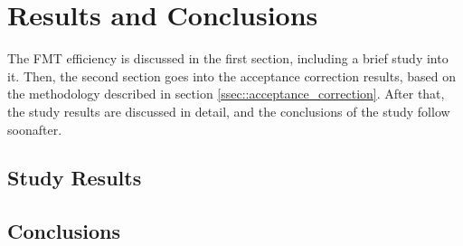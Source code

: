 \section{Results and Conclusions} \label{sec::resultsandconclusions}
    The FMT efficiency is discussed in the first section, including a brief study into it.
    Then, the second section goes into the acceptance correction results, based on the methodology described in section \ref{ssec::acceptance_correction}.
    After that, the study results are discussed in detail, and the conclusions of the study follow soonafter.

    
    

\subsection{Study Results}

\subsection{Conclusions}
